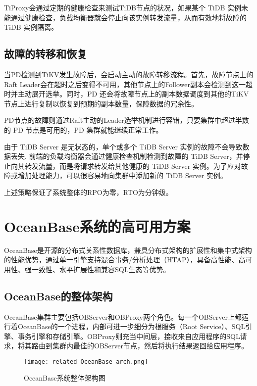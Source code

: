 TiProxy会通过定期的健康检查来测试TiDB节点的状况，如果某个 TiDB 实例未能通过健康检查，负载均衡器就会停止向该实例转发流量，从而有效地将故障的 TiDB 实例隔离。



\subsection{故障的转移和恢复}

当PD检测到TiKV发生故障后，会启动主动的故障转移流程。首先，故障节点上的Raft Leader会在超时之后变得不可用，其他节点上的Follower副本会检测到这一超时并主动展开选举。同时，PD 还会将故障节点上的副本数据调度到其他的TiKV节点上进行复制以恢复到预期的副本数量，保障数据的冗余性。

PD节点的故障则通过Raft主动的Leader选举机制进行容错，只要集群中超过半数的 PD 节点是可用的，PD 集群就能继续正常工作。

由于 TiDB Server 是无状态的，单个或多个 TiDB Server 实例的故障不会导致数据丢失. 前端的负载均衡器会通过健康检查机制检测到故障的 TiDB Server，并停止向其转发流量，而是将请求转发给其他健康的 TiDB Server 实例。为了应对故障或增加处理能力，可以很容易地向集群中添加新的 TiDB Server 实例。

上述策略保证了系统整体的RPO为零，RTO为分钟级。


\section{OceanBase系统的高可用方案}

OceanBase是开源的分布式关系性数据库，兼具分布式架构的扩展性和集中式架构的性能优势，通过单一引擎支持混合事务/分析处理（HTAP），具备高性能、高可用性、强一致性、水平扩展性和兼容SQL生态等优势。

\subsection{OceanBase的整体架构}

OceanBase集群主要包括OBServer和OBProxy两个角色。每一个OBServer上都运行着OceanBase的一个进程，内部可进一步细分为根服务（Root Service）、SQL引擎、事务引擎和存储引擎。OBProxy则充当中间层，接收来自应用程序的SQL请求，将其路由到集群内最佳的OBServer节点，然后将执行结果返回给应用程序。

\begin{figure}
  \centering
  \texttt{[image: related-OceanBase-arch.png]}
  \caption{OceanBase系统整体架构图}
  \label{fig:OceanBase-arch}
\end{figure}

